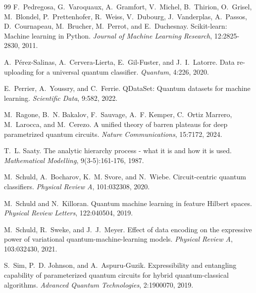 \documentclass{article}
\begin{document}
{\begin{thebibliography}{99}
F.~Pedregosa, G.~Varoquaux, A.~Gramfort, V.~Michel, B.~Thirion, O.~Grisel, M.~Blondel, P.~Prettenhofer, R.~Weiss, V.~Dubourg, J.~Vanderplas, A.~Passos, D.~Cournapeau, M.~Brucher, M.~Perrot, and E.~Duchesnay.
\newblock Scikit-learn: Machine learning in Python.
\newblock \emph{Journal of Machine Learning Research}, 12:2825-2830, 2011.

A.~P\'erez-Salinas, A.~Cervera-Lierta, E.~Gil-Fuster, and J.~I.~Latorre.
\newblock Data re-uploading for a universal quantum classifier.
\newblock \emph{Quantum}, 4:226, 2020.

E.~Perrier, A.~Youssry, and C.~Ferrie.
\newblock QDataSet: Quantum datasets for machine learning.
\newblock \emph{Scientific Data}, 9:582, 2022.

M.~Ragone, B.~N. Bakalov, F.~Sauvage, A.~F. Kemper, C.~Ortiz Marrero, M.~Larocca, and M.~Cerezo.
\newblock A unified theory of barren plateaus for deep parametrized quantum circuits.
\newblock \emph{Nature Communications}, 15:7172, 2024.

T.~L. Saaty.
\newblock The analytic hierarchy process - what it is and how it is used.
\newblock \emph{Mathematical Modelling}, 9(3-5):161-176, 1987.

M.~Schuld, A.~Bocharov, K.~M. Svore, and N.~Wiebe.
\newblock Circuit-centric quantum classifiers.
\newblock \emph{Physical Review A}, 101:032308, 2020.

M.~Schuld and N.~Killoran.
\newblock Quantum machine learning in feature Hilbert spaces.
\newblock \emph{Physical Review Letters}, 122:040504, 2019.

M.~Schuld, R.~Sweke, and J.~J.~Meyer.
\newblock Effect of data encoding on the expressive power of variational quantum-machine-learning models.
\newblock \emph{Physical Review A}, 103:032430, 2021.

S.~Sim, P.~D. Johnson, and A.~Aspuru-Guzik.
\newblock Expressibility and entangling capability of parameterized quantum circuits for hybrid quantum-classical algorithms.
\newblock \emph{Advanced Quantum Technologies}, 2:1900070, 2019.

\end{thebibliography}
}
\end{document}
